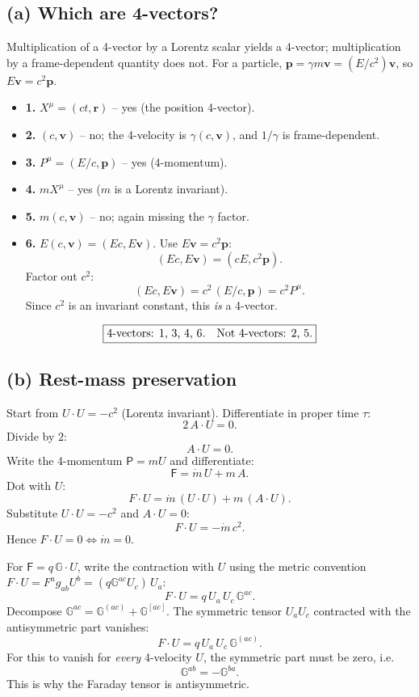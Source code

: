 \documentclass[11pt]{article}
\begin{document}
\subsection*{(a) Which are 4-vectors?}

Multiplication of a 4-vector by a Lorentz scalar yields a 4-vector; multiplication by a frame-dependent quantity does not. For a particle, $\bm p = \gamma m\bm v = (E/c^2)\bm v$, so $E\bm v = c^2\bm p$.
\begin{itemize}
\item \textbf{1.} $X^\mu = (ct,\bm r)$ -- yes (the position 4-vector).
\item \textbf{2.} $(c,\bm v)$ -- no; the 4-velocity is $\gamma(c,\bm v)$, and $1/\gamma$ is frame-dependent.
\item \textbf{3.} $P^\mu=(E/c,\bm p)$ -- yes (4-momentum).
\item \textbf{4.} $m X^\mu$ -- yes ($m$ is a Lorentz invariant).
\item \textbf{5.} $m(c,\bm v)$ -- no; again missing the $\gamma$ factor.
\item \textbf{6.} $E(c,\bm v) = (Ec,E\bm v)$. Use $E\bm v = c^2\bm p$:
\[ (Ec,E\bm v) = (cE,c^2\bm p). \]
Factor out $c^2$:
\[ (Ec,E\bm v) = c^2\,(E/c,\bm p) = c^2 P^\mu. \]
Since $c^2$ is an invariant constant, this \emph{is} a 4-vector.
\end{itemize}
\begin{equation}
\boxed{\text{4-vectors: 1, 3, 4, 6.\quad Not 4-vectors: 2, 5.}}
\end{equation}

\subsection*{(b) Rest-mass preservation}

Start from $U\cdot U=-c^2$ (Lorentz invariant). Differentiate in proper time $\tau$:
\[ 2\,A\cdot U = 0. \]
Divide by $2$:
\[ A\cdot U = 0. \]
Write the 4-momentum $\mathsf P = mU$ and differentiate:
\[ \mathsf F = \dot m\,U + m\,A. \]
Dot with $U$:
\[ F\cdot U = \dot m\,(U\cdot U) + m\,(A\cdot U). \]
Substitute $U\cdot U=-c^2$ and $A\cdot U=0$:
\[ F\cdot U = -\dot m\,c^2. \]
Hence $F\cdot U=0\Leftrightarrow\dot m=0$.

For $\mathsf F = q\,\mathbb{G}\cdot U$, write the contraction with $U$ using the metric convention $F\cdot U = F^a g_{ab}U^b = (q\mathbb{G}^{ac}U_c)\,U_a$:
\[ F\cdot U = q\,U_a\,U_c\,\mathbb{G}^{ac}. \]
Decompose $\mathbb{G}^{ac} = \mathbb{G}^{(ac)} + \mathbb{G}^{[ac]}$. The symmetric tensor $U_a U_c$ contracted with the antisymmetric part vanishes:
\[ F\cdot U = q\,U_a\,U_c\,\mathbb{G}^{(ac)}. \]
For this to vanish for \emph{every} 4-velocity $U$, the symmetric part must be zero, i.e.
\begin{equation}
\boxed{\mathbb{G}^{ab} = -\mathbb{G}^{ba}.}
\end{equation}
This is why the Faraday tensor is antisymmetric.
\end{document}
